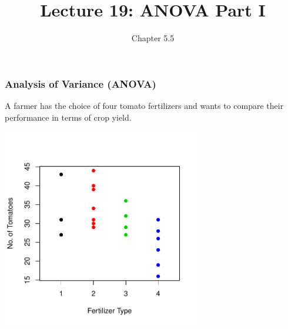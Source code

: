 \documentclass[handout]{beamer}
\title{Lecture 19: ANOVA Part I}
\author{Chapter 5.5}
\date{}
\newcommand{\blue}[1]{\textcolor{blue2}{#1}}
\begin{document}
\begin{frame}
\titlepage
\end{frame}


%
%	


\begin{frame}[fragile]
\frametitle{Analysis of Variance (ANOVA)}
A farmer has the choice of four tomato fertilizers and wants to compare their performance in terms of crop yield.
\begin{center}
\pause\includegraphics[width=0.65\textwidth]{figure/lec22-003}
\end{center}

\end{frame}
\end{document}
